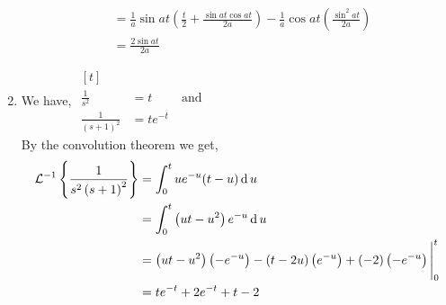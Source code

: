 \documentclass[12pt,class=book,crop=false]{standalone}
\newcommand{\ilap}[1]{\mathcal{L}^{-1}\left\{ #1\right\}}
\begin{document}
\begin{soln}
\begin{enumerate}[label=(\alph*)]
\begin{align*}
                                                            & =\frac{1}{a}\sin at \left(\frac{t}{2}+ \frac{\sin at\cos at}{2a} \right)-\frac{1}{a}\cos at \left( \frac{\sin^2 at}{2a} \right) \\
                                                            & =\frac{2\sin at}{2a}
              \end{align*}
        \item We have, $ \begin{aligned}[t]
                                        &                 \\
                      \frac{1}{s^2}     & =t \qquad\text{ and } \\
                      \frac{1}{(s+1)^2} & =te^{-t}
                  \end{aligned} $\\
              By the convolution theorem we get,
              \begin{align*}
                  \ilap{\frac{1}{s^2\left( s+1 \right)^2}} & =\int_0^t ue^{-u}(t-u)\D u                                                                                     \\
                                                           & =\int_0^t \left(ut-u^2\right)e^{-u}\D u                                                                        \\
                                                           & =\left(ut-u^2\right)\left(-e^{-u}\right)-(t-2u)\left( e^{-u} \right)+(-2)\left( -e^{-u} \right)\Biggl\vert_0^t \\
                                                           & =te^{-t}+2e^{-t}+t-2
              \end{align*}
    \end{enumerate}
\end{soln}
\end{document}
